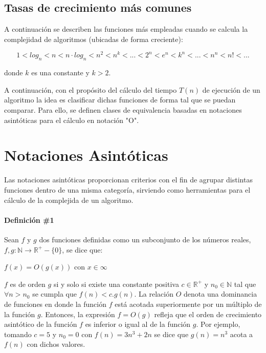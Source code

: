 \subsection{Tasas de crecimiento más comunes} \label{lb:tasa}
 
A continuación se describen las funciones más empleadas cuando se calcula la complejidad de algoritmos (ubicadas de forma creciente):

$$1 < log_n < n < n \cdot log_n < n^2 < n^k < ... < 2^n < e^n < k^n < ... < n^n < n! < ...$$

\noindent donde $k$ es una constante y $k > 2$.

A continuación, con el propósito del cálculo del tiempo $T(n)$ de ejecución de un algoritmo la idea es clasificar dichas funciones de forma tal que se puedan comparar. Para ello, se definen clases de equivalencia basadas en notaciones asintóticas para el cálculo en notación "O".

\section{Notaciones Asintóticas}

Las notaciones asintóticas proporcionan criterios con el fin de agrupar distintas funciones dentro de una misma categoría, sirviendo como herramientas para el cálculo de la complejida de un algoritmo.

\paragraph{Definición \#1}

Sean $f$ y $g$ dos funciones definidas como un subconjunto de los números reales, $f,g:\mathbb{N} \to \mathbb{R}^+-\{0\}$, se dice que:

$f(x) = O(g(x))$ con $x \in \infty$

$f$ es de orden $g$ si y solo si existe una constante positiva $c \in \mathbb{R}^+$ y $n_0 \in \mathbb{N}$ tal que $\forall n > n_0$ se cumpla que $f(n) < c.g(n)$. La relación $O$ denota una dominancia de funciones en donde la función $f$ está acotada superiormente por un múltiplo de la función $g$. Entonces, la expresión $f=O(g)$ refleja que el orden de crecimiento asintótico de la función $f$ es inferior o igual al de la función $g$. Por ejemplo, tomando $c=5$ y $n_0 = 0$ con $f(n) = 3n^3 + 2n$ se dice que $g(n) = n^3$ acota a $f(n)$ con dichos valores.

